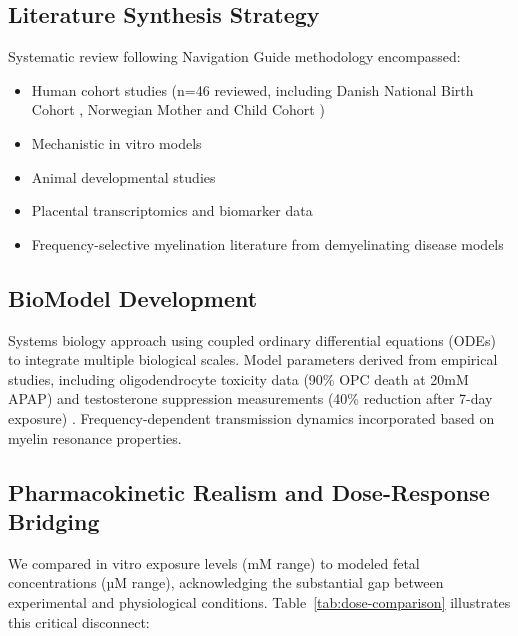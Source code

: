 \documentclass[11pt]{article}
\let\oldsubsection\subsection
\renewcommand{\subsection}[1]{\oldsubsection{#1}\setlength{\leftskip}{0.75em}}
\begin{document}
\subsection{Literature Synthesis Strategy}
Systematic review following Navigation Guide methodology \citep{navarro2025} encompassed:
\begin{itemize}
\item Human cohort studies (n=46 reviewed, including Danish National Birth Cohort \citep{liew2016}, Norwegian Mother and Child Cohort \citep{brandlistuen2013,ystrom2017})
\item Mechanistic in vitro models \citep{perez2012,posadas2019}
\item Animal developmental studies \citep{viberg2014,philippot2022,blecharz2018}
\item Placental transcriptomics and biomarker data \citep{ji2020}
\item Frequency-selective myelination literature from demyelinating disease models
\end{itemize}

\subsection{BioModel Development}
Systems biology approach using coupled ordinary differential equations (ODEs) to integrate multiple biological scales. Model parameters derived from empirical studies, including oligodendrocyte toxicity data (90\% OPC death at 20mM APAP) \citep{perez2012} and testosterone suppression measurements (40\% reduction after 7-day exposure) \citep{kristensen2016}. Frequency-dependent transmission dynamics incorporated based on myelin resonance properties.

\subsection{Pharmacokinetic Realism and Dose-Response Bridging}
We compared in vitro exposure levels (mM range) to modeled fetal concentrations (µM range), acknowledging the substantial gap between experimental and physiological conditions. Table~\ref{tab:dose-comparison} illustrates this critical disconnect:
\end{document}
